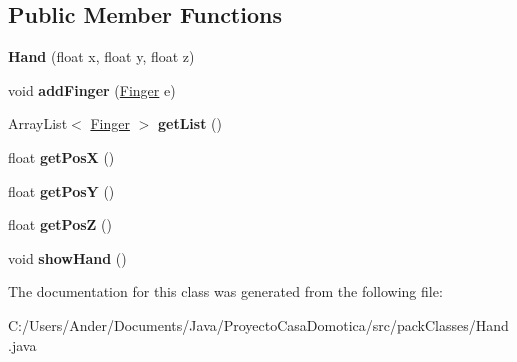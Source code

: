 \subsection*{Public Member Functions}
\begin{DoxyCompactItemize}
\item 
\mbox{\label{classpack_classes_1_1_hand_a242c41d0a17f6b215263482594ae3c51}} 
{\bfseries Hand} (float x, float y, float z)
\item 
\mbox{\label{classpack_classes_1_1_hand_ac9c9bbef53fd8cacef78faff64a7a66d}} 
void {\bfseries add\+Finger} (\mbox{\hyperlink{classpack_classes_1_1_finger}{Finger}} e)
\item 
\mbox{\label{classpack_classes_1_1_hand_a1d7ef1e6baa7529538124e4f02b5363e}} 
Array\+List$<$ \mbox{\hyperlink{classpack_classes_1_1_finger}{Finger}} $>$ {\bfseries get\+List} ()
\item 
\mbox{\label{classpack_classes_1_1_hand_a745ce995b2a86f52e1618ba1e417c972}} 
float {\bfseries get\+PosX} ()
\item 
\mbox{\label{classpack_classes_1_1_hand_a363461f4e710bc9c5311247ce1ade6d0}} 
float {\bfseries get\+PosY} ()
\item 
\mbox{\label{classpack_classes_1_1_hand_a460322f622a81e96c6139e1bf1e95cb9}} 
float {\bfseries get\+PosZ} ()
\item 
\mbox{\label{classpack_classes_1_1_hand_afa2f75f64c8049a207f8d6aa4c05af36}} 
void {\bfseries show\+Hand} ()
\end{DoxyCompactItemize}


The documentation for this class was generated from the following file\+:\begin{DoxyCompactItemize}
\item 
C\+:/\+Users/\+Ander/\+Documents/\+Java/\+Proyecto\+Casa\+Domotica/src/pack\+Classes/Hand.\+java\end{DoxyCompactItemize}
